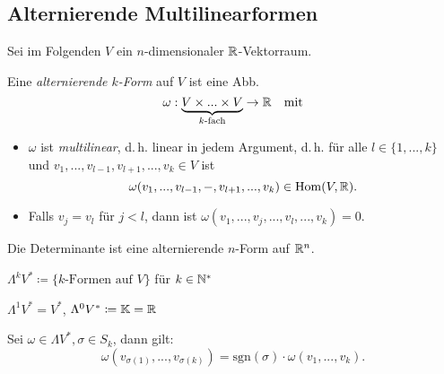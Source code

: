 \documentclass{cheat-sheet}
\theoremstyle{definition}
\begin{document}
\begin{samepage}

\section{Alternierende Multilinearformen}

\begin{nota}
  Sei im Folgenden $V$ ein $n$-dimensionaler $\mathbb{R}$-Vektorraum.
\end{nota}

\begin{defn}
  Eine \emph{alternierende $k$-Form} auf $V$ ist eine Abb.
  \[ \omega : \underbrace{V \times ... \times V}_{\text{$k$-fach}} \to \mathbb{R} \quad \text{mit} \]
  \begin{itemize}
    \item $\omega$ ist \emph{multilinear}, d.\,h. linear in jedem Argument, d.\,h. für alle $l \in \{ 1, ..., k \}$ und $v_1, ..., v_{l-1}, v_{l+1}, ..., v_k \in V$ ist
    \[ \omega(v_1, ..., v_{l-1}, -, v_{l+1}, ..., v_k) \in \mathrm{Hom}(V, \mathbb{R}). \]
    \item Falls $v_j = v_l$ für $j < l$, dann ist $\omega(v_1, ..., v_j, ..., v_l, ..., v_k) = 0$.
  \end{itemize}
\end{defn}

\begin{bsp}
  Die Determinante ist eine alternierende $n$-Form auf $\mathbb{R}^n$.
\end{bsp}

\begin{nota}
  $\Lambda^k V^* \coloneqq \{ \text{$k$-Formen auf $V$} \}$ für $k \in \mathbb{N}^*$
\end{nota}

\begin{bem}
  $\Lambda^1 V^* = V^*$, $\Lambda^0 V^* \coloneqq \mathbb{K} = \mathbb{R}$
\end{bem}

\begin{lem}
  Sei $\omega \in \Lambda V^*, \sigma \in S_k$, dann gilt:
  \[ \omega(v_{\sigma(1)}, ..., v_{\sigma(k)}) = \mathrm{sgn}(\sigma) \cdot \omega(v_1, ..., v_k). \]
\end{lem}

\end{samepage}

\iffalse
\begin{nota}
  $\Lambda V^* \coloneqq \oplus_{k=1}^n \Lambda^k V^*$
\end{nota}
\fi
\end{document}
